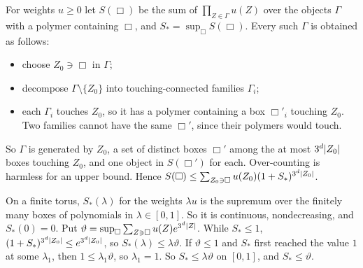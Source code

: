 \begin{detail}
\begin{step}
For weights $u\ge0$ let $S(\Box)$ be the sum of $\prod_{Z\in\Gamma}u(Z)$ over the objects $\Gamma$ with a polymer containing $\Box$, and $S_*=\sup_\Box S(\Box)$. Every such $\Gamma$ is obtained as follows:
\begin{itemize}
\item choose $Z_0\ni\Box$ in $\Gamma$;
\item decompose $\Gamma\setminus\{Z_0\}$ into touching-connected families $\Gamma_i$;
\item each $\Gamma_i$ touches $Z_0$, so it has a polymer containing a box $\Box'_i$ touching $Z_0$. Two families cannot have the same $\Box'$, since their polymers would touch.
\end{itemize}
So $\Gamma$ is generated by $Z_0$, a set of distinct boxes $\Box'$ among the at most $3^d\lvert Z_0\rvert$ boxes touching $Z_0$, and one object in $S(\Box')$ for each. Over-counting is harmless for an upper bound. Hence $S(\Box)\le\sum_{Z_0\ni\Box}u(Z_0)(1+S_*)^{3^d\lvert Z_0\rvert}$.

On a finite torus, $S_*(\lambda)$ for the weights $\lambda u$ is the supremum over the finitely many boxes of polynomials in $\lambda\in[0,1]$. So it is continuous, nondecreasing, and $S_*(0)=0$. Put $\vartheta=\sup_\Box\sum_{Z\ni\Box}u(Z)e^{3^d\lvert Z\rvert}$. While $S_*\le1$, $(1+S_*)^{3^d\lvert Z_0\rvert}\le e^{3^d\lvert Z_0\rvert}$, so $S_*(\lambda)\le\lambda\vartheta$. If $\vartheta\le1$ and $S_*$ first reached the value $1$ at some $\lambda_1$, then $1\le\lambda_1\vartheta$, so $\lambda_1=1$. So $S_*\le\lambda\vartheta$ on $[0,1]$, and $S_*\le\vartheta$.
\end{step}


\end{detail}
